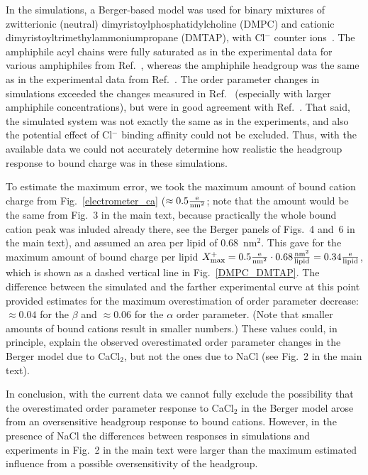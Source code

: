 \documentclass[twoside,twocolumn,9pt]{article}
\begin{document}
In the simulations, a Berger-based model was used for binary mixtures of zwitterionic (neutral) dimyristoylphosphatidylcholine (DMPC)
and cationic dimyristoyltrimethylammoniumpropane (DMTAP), with Cl$^-$ counter ions~\cite{miettinen09,DMPC_DMTAP0mol,DMPC_DMTAP6mol,DMPC_DMTAP50mol}. 
The amphiphile acyl chains were fully saturated as in the experimental data for various 
amphiphiles from Ref.~, whereas the amphiphile headgroup was the same as in the experimental data 
from Ref.~. The order parameter changes in simulations exceeded the changes measured in Ref.~
(especially with larger amphiphile concentrations), but were in good agreement with Ref.~. That said, the simulated
system was not exactly the same as in the experiments, and also the potential effect of Cl$^-$ binding affinity could not be excluded.
Thus, with the available data we could not accurately determine how realistic the headgroup response to bound charge was in these simulations. 

To estimate the maximum error, we took the maximum amount of bound cation charge from Fig.~\ref{electrometer_ca} ($\approx0.5\frac{\rm e}{\rm nm^2}$;
note that the amount would be the same from Fig.~3 in the main text, because practically the whole bound cation peak was inluded already there, see
the Berger panels of Figs.~4 and~6 in the main text),
and assumed an area per lipid of 0.68~nm$^2$. This gave for the maximum amount of bound 
charge per lipid $X^+_{\rm max}=0.5\frac{\rm e}{\rm nm^2}\cdot 0.68\frac{\rm nm^2}{\rm lipid}=0.34\frac{\rm e}{\rm lipid}$,
which is shown as a dashed vertical line in Fig.~\ref{DMPC_DMTAP}. The difference between the simulated and
the farther experimental curve at this point provided estimates for the maximum
overestimation of order parameter decrease: $\approx0.04$ for the $\beta$ and $\approx0.06$ for the $\alpha$ order parameter.
(Note that smaller amounts of bound cations result in smaller numbers.)
These values could, in principle, explain the observed overestimated order parameter changes in the Berger model due to CaCl$_2$, but not the ones due to
NaCl (see Fig.~2 in the main text).

In conclusion, with the current data we cannot fully exclude the possibility that the overestimated order parameter response to
CaCl$_2$ in the Berger model arose from an oversensitive headgroup response to bound cations. However, in the presence of NaCl
the differences between responses in simulations and experiments in Fig.~2 in the main text were larger than the maximum estimated 
influence from a possible oversensitivity of the headgroup. 
\end{document}
